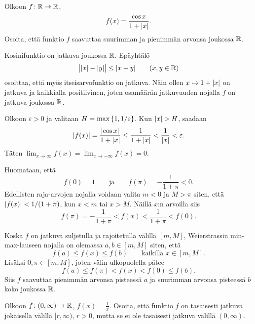 \documentclass[11pt,a4paper]{amsart}
\begin{document}
\begin{exercise}
  Olkoon \(f \colon \mathbb{R} \to \mathbb{R}\),
  \[
    f(x) = \frac{\cos x}{1 + \lvert x\rvert}.
  \]
  Osoita, että funktio \(f\) saavuttaa suurimman ja pienimmän arvonsa
  joukossa \(\mathbb{R}\).
\end{exercise}

\begin{solution}
  Kosinifunktio on jatkuva joukossa \(\mathbb{R}\). Epäyhtälö
  \[
    \bigl|\lvert x\rvert-\lvert y\rvert\bigr| \leq \lvert x-y\rvert
    \qquad (x,y \in \mathbb{R})
  \]
  osoittaa, että myös itseisarvofunktio on jatkuva. Näin ollen
  \(x \mapsto 1+\lvert x\rvert\) on jatkuva ja kaikkialla positiivinen,
  joten osamäärän jatkuvuuden nojalla \(f\) on jatkuva joukossa \(\mathbb{R}\).

  Olkoon \(\varepsilon > 0\) ja valitaan
  \(H = \max\left\lbrace1,1/\varepsilon\right\rbrace\). Kun \(\lvert x\rvert > H\), saadaan
  \[
    \lvert f(x)\rvert = \frac{\lvert\cos x\rvert}{1+\lvert x\rvert}
    \leq \frac{1}{1+\lvert x\rvert}
    < \frac{1}{\lvert x\rvert} < \varepsilon.
  \]
  Täten \(\lim_{x \to \infty} f(x) = \lim_{x \to -\infty} f(x) = 0\).

  Huomataan, että
  \[
    f(0) = 1
    \qquad\text{ja}\qquad
    f(\pi) = -\frac{1}{1+\pi} < 0.
  \]
  Edellisten raja-arvojen nojalla voidaan valita \(m < 0\) ja \(M > \pi\)
  siten, että \(\lvert f(x)\rvert < 1/(1+\pi)\), kun \(x < m\) tai \(x > M\).
  Näillä \(x\):n arvoilla siis
  \[
    f(\pi) = -\frac{1}{1+\pi}
    < f(x) < \frac{1}{1+\pi} < f(0).
  \]

  Koska \(f\) on jatkuva suljetulla ja rajoitetulla välillä \([m,M]\),
  Weierstrassin min-max-lauseen nojalla on olemassa \(a,b \in [m,M]\)
  siten, että
  \[
    f(a) \leq f(x) \leq f(b)
    \qquad\text{kaikilla } x \in [m,M].
  \]
  Lisäksi \(0,\pi \in [m,M]\), joten välin ulkopuolella pätee
  \[
    f(a) \leq f(\pi) < f(x) < f(0) \leq f(b).
  \]
  Siis \(f\) saavuttaa pienimmän arvonsa pisteessä \(a\) ja suurimman
  arvonsa pisteessä \(b\) koko joukossa \(\mathbb{R}\).
\end{solution}

\begin{exercise}
  Olkoon \(f \colon (0, \infty) \to \mathbb{R}\), \(f(x) = \frac{1}{x}\).
  Osoita, että funktio \(f\) on tasaisesti jatkuva jokaisella välillä
  \([r, \infty)\), \(r > 0\), mutta se ei ole tasaisesti jatkuva välillä
  \((0, \infty)\).
\end{exercise}
\end{document}
